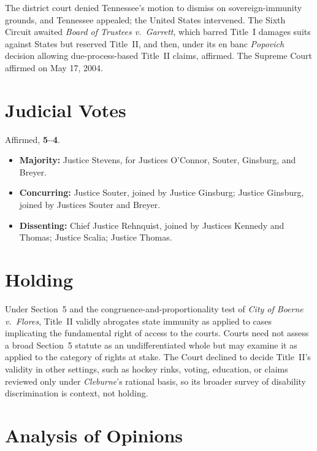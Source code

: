 \documentclass[12pt]{article}
\begin{document}
The district court denied Tennessee's motion to dismiss on sovereign-immunity grounds, and Tennessee appealed; the United States intervened. The Sixth Circuit awaited \textit{Board of Trustees v.\ Garrett}, which barred Title~I damages suits against States but reserved Title~II, and then, under its en banc \textit{Popovich} decision allowing due-process-based Title~II claims, affirmed. The Supreme Court affirmed on May 17, 2004.

\section{Judicial Votes}

Affirmed, \textbf{5--4}.
\begin{itemize}
\item \textbf{Majority:} Justice Stevens, for Justices O'Connor, Souter, Ginsburg, and Breyer.
\item \textbf{Concurring:} Justice Souter, joined by Justice Ginsburg; Justice Ginsburg, joined by Justices Souter and Breyer.
\item \textbf{Dissenting:} Chief Justice Rehnquist, joined by Justices Kennedy and Thomas; Justice Scalia; Justice Thomas.
\end{itemize}

\section{Holding}

Under Section~5 and the congruence-and-proportionality test of \textit{City of Boerne v.\ Flores}, Title~II validly abrogates state immunity as applied to cases implicating the fundamental right of access to the courts. Courts need not assess a broad Section~5 statute as an undifferentiated whole but may examine it as applied to the category of rights at stake. The Court declined to decide Title~II's validity in other settings, such as hockey rinks, voting, education, or claims reviewed only under \textit{Cleburne}'s rational basis, so its broader survey of disability discrimination is context, not holding.

\section{Analysis of Opinions}
\end{document}
